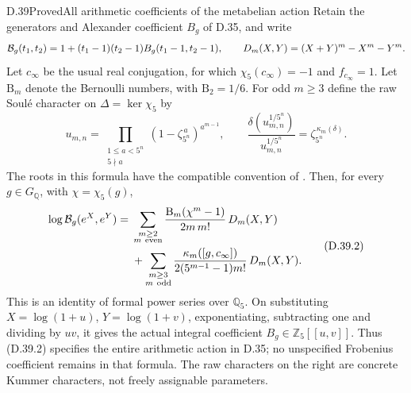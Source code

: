 \begin{statement}{D.39}{Proved}{All arithmetic coefficients of the metabelian action}
Retain the generators and Alexander coefficient \(B_g\) of D.35,
and write
\[
 {\cal B}_g(t_1,t_2)
 =1+(t_1-1)(t_2-1)B_g(t_1-1,t_2-1),\qquad
 D_m(X,Y)=(X+Y)^m-X^m-Y^m.
\]
Let \(c_\infty\) be the usual real conjugation, for which
\(\chi_5(c_\infty)=-1\) and \(f_{c_\infty}=1\).
Let \(\mathrm B_m\) denote the Bernoulli numbers, with
\(\mathrm B_2=1/6\).
For odd \(m\ge3\) define the raw Soul\'e character on
\(\Delta=\ker\chi_5\) by
\[
 u_{m,n}=\prod_{\substack{1\le a<5^n\\5\nmid a}}
                   (1-\zeta_{5^n}^{\,a})^{a^{m-1}},\qquad
 \frac{\delta(u_{m,n}^{1/5^n})}{u_{m,n}^{1/5^n}}
             =\zeta_{5^n}^{\,\kappa_m(\delta)}.             \tag{D.39.1}
\]
The roots in this formula have the compatible convention of
\cite[(1.1)--(1.2)]{DE_NakamuraSakugawaWojtkowiak2017}.
Then, for every \(g\in G_{\mathbb Q}\), with \(\chi=\chi_5(g)\),
\[
\begin{split}
 \log {\cal B}_g(e^X,e^Y)
 ={}&
 \sum_{\substack{m\ge2\\m\ {\rm even}}}
 \frac{\mathrm B_m(\chi^m-1)}{2m\,m!}\,D_m(X,Y)\\
 &+\sum_{\substack{m\ge3\\m\ {\rm odd}}}
 \frac{\kappa_m([g,c_\infty])}
      {2(5^{m-1}-1)m!}\,D_m(X,Y).
\end{split}
\tag{D.39.2}
\]
This is an identity of formal power series over \(\mathbb Q_5\).
On substituting \(X=\log(1+u)\), \(Y=\log(1+v)\), exponentiating,
subtracting one and dividing by \(uv\), it gives the actual
integral coefficient \(B_g\in\mathbb Z_5[[u,v]]\).
Thus (D.39.2) specifies the entire arithmetic action in D.35;
no unspecified Frobenius coefficient remains in that formula.
The raw characters on the right are concrete Kummer characters,
not freely assignable parameters.
\end{statement}
